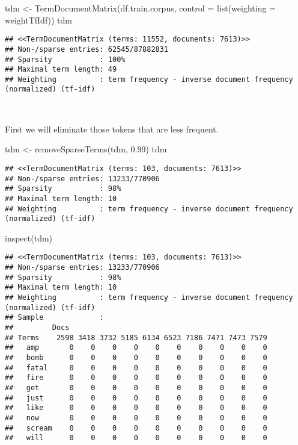 \documentclass[
]{article}
\newenvironment{Shaded}{\begin{snugshade}}{\end{snugshade}}
\newcommand{\AttributeTok}[1]{\textcolor[rgb]{0.77,0.63,0.00}{#1}}
\newcommand{\FloatTok}[1]{\textcolor[rgb]{0.00,0.00,0.81}{#1}}
\newcommand{\FunctionTok}[1]{\textcolor[rgb]{0.00,0.00,0.00}{#1}}
\newcommand{\NormalTok}[1]{#1}
\newcommand{\OtherTok}[1]{\textcolor[rgb]{0.56,0.35,0.01}{#1}}
\begin{document}
\begin{Shaded}
\begin{Highlighting}[]
\NormalTok{tdm }\OtherTok{\textless{}{-}} \FunctionTok{TermDocumentMatrix}\NormalTok{(df.train.corpus, }\AttributeTok{control =} \FunctionTok{list}\NormalTok{(}\AttributeTok{weighting =}\NormalTok{ weightTfIdf))}
\NormalTok{tdm}
\end{Highlighting}
\end{Shaded}

\begin{verbatim}
## <<TermDocumentMatrix (terms: 11552, documents: 7613)>>
## Non-/sparse entries: 62545/87882831
## Sparsity           : 100%
## Maximal term length: 49
## Weighting          : term frequency - inverse document frequency (normalized) (tf-idf)
\end{verbatim}

~

First we will eliminate those tokens that are less frequent.

\begin{Shaded}
\begin{Highlighting}[]
\NormalTok{tdm }\OtherTok{\textless{}{-}} \FunctionTok{removeSparseTerms}\NormalTok{(tdm, }\FloatTok{0.99}\NormalTok{)}
\NormalTok{tdm}
\end{Highlighting}
\end{Shaded}

\begin{verbatim}
## <<TermDocumentMatrix (terms: 103, documents: 7613)>>
## Non-/sparse entries: 13233/770906
## Sparsity           : 98%
## Maximal term length: 10
## Weighting          : term frequency - inverse document frequency (normalized) (tf-idf)
\end{verbatim}

\begin{Shaded}
\begin{Highlighting}[]
\FunctionTok{inspect}\NormalTok{(tdm)}
\end{Highlighting}
\end{Shaded}

\begin{verbatim}
## <<TermDocumentMatrix (terms: 103, documents: 7613)>>
## Non-/sparse entries: 13233/770906
## Sparsity           : 98%
## Maximal term length: 10
## Weighting          : term frequency - inverse document frequency (normalized) (tf-idf)
## Sample             :
##         Docs
## Terms    2598 3418 3732 5185 6134 6523 7186 7471 7473 7579
##   amp       0    0    0    0    0    0    0    0    0    0
##   bomb      0    0    0    0    0    0    0    0    0    0
##   fatal     0    0    0    0    0    0    0    0    0    0
##   fire      0    0    0    0    0    0    0    0    0    0
##   get       0    0    0    0    0    0    0    0    0    0
##   just      0    0    0    0    0    0    0    0    0    0
##   like      0    0    0    0    0    0    0    0    0    0
##   now       0    0    0    0    0    0    0    0    0    0
##   scream    0    0    0    0    0    0    0    0    0    0
##   will      0    0    0    0    0    0    0    0    0    0
\end{verbatim}
\end{document}
